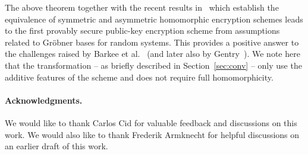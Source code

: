 \documentclass[draft]{llncs}
\begin{document}
The above theorem together with the recent results in~\cite{Ro10} which establish the equivalence of symmetric and asymmetric homomorphic encryption schemes leads to the first provably secure public-key encryption scheme from assumptions related to Gröbner bases for random systems. This provides a positive answer to the challenges raised by Barkee et al.~\cite{DBLP:journals/jsc/BarkeeCEMR94} (and later also by Gentry~\cite{gentry09thesis}). We note here that the transformation -- as briefly described in Section~\ref{sec:conv} -- only use the additive features of the scheme and does not require full homomorphicity. 

\vspace{-3mm}
\paragraph{Acknowledgments.} We would like to thank Carlos Cid for valuable feedback and discussions on this work. We would also like to thank Frederik Armknecht for helpful discussions on an earlier draft of this work. 
\end{document}

